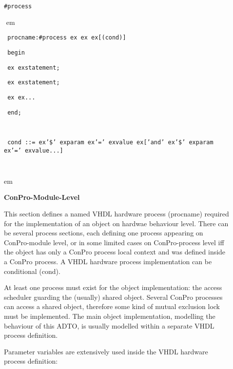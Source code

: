 \documentclass[a4paper,12pt,twoside,english]{article}
\def\s{\hskip 1.15 ex}
\begin{document}
\def\thesubsection{\tocC}
\secII{\label{toclabelC}\thesubsection}
\begin{description}
\item[] $ $\\
{\tt \#process}

\item[]
\def\prefskipu{}\def\prefskipo{}\def\prefskipa{}\def\prefskipu{\hskip10pt}\def\prefskipo{\hskip10pt}\def\prefskipa{\hskip20pt}\def\content{
\vskip-5pt{\parindent0pt\parbox{\linewidth}{\tt\smallsize\hskip10pt procname:\#process\s \s \s {[}(cond){]}}}
\vskip-5pt{\parindent0pt\parbox{\linewidth}{\tt\smallsize\hskip10pt begin}}
\vskip-5pt{\parindent0pt\parbox{\linewidth}{\tt\smallsize\hskip10pt \s \s statement;}}
\vskip-5pt{\parindent0pt\parbox{\linewidth}{\tt\smallsize\hskip10pt \s \s statement;}}
\vskip-5pt{\parindent0pt\parbox{\linewidth}{\tt\smallsize\hskip10pt \s \s ...}}
\vskip-5pt{\parindent0pt\parbox{\linewidth}{\tt\smallsize\hskip10pt end;}}
\vskip-5pt{\parindent0pt\parbox{\linewidth}{\tt\smallsize\hskip10pt }}
\vskip-5pt{\parindent0pt\parbox{\linewidth}{\tt\smallsize\hskip10pt cond~::=\s '\$'\s param\s '='\s value\s {[}'and'\s '\$'\s param\s '='\s value...{]}}}
\vskip-5pt{\parindent0pt\parbox{\linewidth}{\tt\smallsize\hskip10pt }}
}
$ $
 em
\content
{} em
\item[] $ $\\
{\bfseries ConPro-Module-Level}

This section defines a named  VHDL hardware process (procname) required for the implementation of an object on hardwae behaviour level. There can be several
process sections, each defining one process appearing on ConPro-module level, or in some limited cases on ConPro-process level iff the object  has only a ConPro
process local context and was defined inside a ConPro process.  A VHDL hardware process implementation can be conditional (cond).

At least one process must exist for the object implementation: the access scheduler guarding the (usually) shared object. Several ConPro processes can access a
shared object, therefore some kind of mutual exclusion lock must be implemented. The main object implementation, modelling the behaviour of this ADTO,  is
usually modelled within a separate VHDL process definition. 

Parameter variables are extensively used inside the VHDL hardware process definition:



\end{description}
\end{document}
